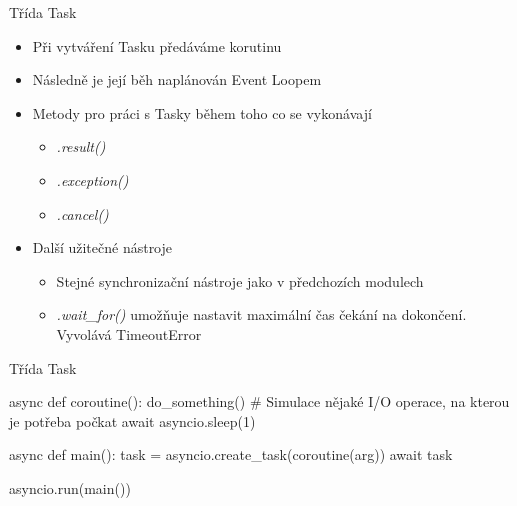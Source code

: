 \documentclass{beamer}
\begin{document}
\begin{frame}{Třída Task}
    \begin{itemize}
        \item Při vytváření Tasku předáváme korutinu
        \item Následně je její běh naplánován Event Loopem
        \item Metody pro práci s Tasky během toho co se vykonávají
        \begin{itemize}
            \item \textit{.result()}
            \item \textit{.exception()}
            \item \textit{.cancel()}
        \end{itemize}
        
        \vskip 0.25in
        \item Další užitečné nástroje
        \begin{itemize}
            \item Stejné synchronizační nástroje jako v předchozích modulech

            \item \textit{.wait\_for()} umožňuje nastavit maximální čas čekání na dokončení. Vyvolává TimeoutError
        \end{itemize}
    \end{itemize}
\end{frame}

\begin{frame}[fragile]{Třída Task}
    \scriptsize
    \begin{semiverbatim}
    async def coroutine(): 
    	do_something()
    	# Simulace nějaké I/O operace, na kterou je potřeba počkat
    	await asyncio.sleep(1) 

    async def main():
        task = asyncio.create_task(coroutine(arg))
        await task

    asyncio.run(main())
    \end{semiverbatim}
\end{frame}
\end{document}
